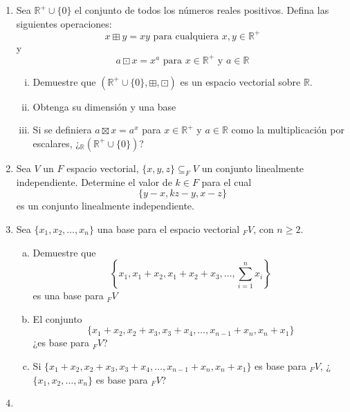 \documentclass{article}
\begin{document}
\begin{enumerate}
        \item Sea $\mathbb{R}^+\cup\{0\}$ el conjunto de todos los números reales positivos. Defina las siguientes operaciones:
        $$x\boxplus y=xy \text{ para cualquiera } x,y\in\mathbb{R}^+$$ y
        $$a\boxdot x=x^a \text{ para } x\in\mathbb{R}^+ \text{ y } a\in\mathbb{R}$$
        \begin{enumerate}[i.]
            \item {
                Demuestre que $(\mathbb{R}^+\cup\{0\},\boxplus,\boxdot)$ es un espacio vectorial sobre $\mathbb{R}$.
            }
            \item {
                Obtenga su dimensión y una base
            }
            \item {
                Si se definiera $a\boxtimes x=a^x$ para $x\in\mathbb{R}^+$ y $a\in\mathbb{R}$ como la multiplicación por escalares, ¿$_\mathbb{R}(\mathbb{R}^+\cup\{0\})$?
            }
        \end{enumerate}

        \item {
            Sea $V$ un $F$ espacio vectorial, $\{x,y,z\}\subseteq_{F}V$ un conjunto linealmente independiente. Determine el valor de $k\in F$ para el cual $$\{y-x,kz-y,x-z\}$$ es un conjunto linealmente independiente.
        }

        \item Sea $\{x_1,x_2,\ldots,x_n\}$ una base para el espacio vectorial $_{F}V$, con $n\geq 2$.
        \begin{enumerate}[a.]
            \item {
                Demuestre que $$\left\{x_1,x_1+x_2,x_1+x_2+x_3,\ldots,\sum_{i=1}^{n}{x_i}\right\}$$ es una base para $_{F}V$
            }
            \item {
                El conjunto $$\{x_1+x_2,x_2+x_3,x_3+x_4,\ldots,x_{n-1}+x_n,x_n+x_1\}$$ ¿es base para $_{F}V$?
            }
            \item {
                Si $\{x_1+x_2,x_2+x_3,x_3+x_4,\ldots,x_{n-1}+x_n,x_n+x_1\}$ es base para $_{F}V$, ¿$\{x_1,x_2,\ldots,x_n\}$ es base para $_{F}V$?
            }
        \end{enumerate}

        \item 
    \end{enumerate}
\end{document}
